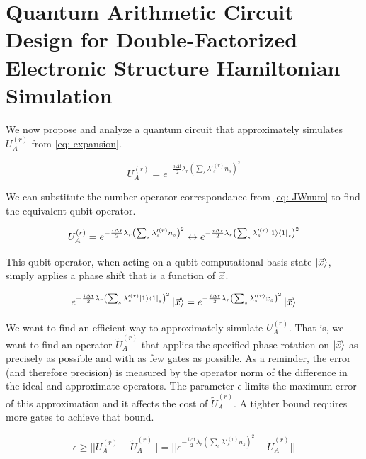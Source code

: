

\chapter{Quantum Arithmetic Circuit Design for Double-Factorized Electronic Structure Hamiltonian Simulation}

We now propose and analyze a quantum circuit that approximately simulates $U_A^{(r)}$ from \eqref{eq: expansion}.

\begin{equation}
    U_A^{(r)} = e^{-\frac{i\Delta t}{2}\lambda_r\left(\sum_s \lambda'^{(r)}_s n_s\right)^2} \label{eq: U_A}
\end{equation}

We can substitute the number operator correspondance from \eqref{eq: JWnum} to find the equivalent qubit operator.

\begin{equation}
    U_A^{(r)} = e^{-\frac{i\Delta t}{2}\lambda_r\left(\sum_s \lambda'^{(r)}_s n_s\right)^2} \leftrightarrow e^{-\frac{i\Delta t}{2}\lambda_r\left(\sum_s \lambda'^{(r)}_s \ket{1}\bra{1}_s\right)^2}
\end{equation}

This qubit operator, when acting on a qubit computational basis state $\ket{\vec{x}}$, simply applies a phase shift that is a function of $\vec{x}$.

\begin{equation}
    e^{-\frac{i\Delta t}{2}\lambda_r\left(\sum_s \lambda'^{(r)}_s \ket{1}\bra{1}_s\right)^2}\ket{\vec{x}} = e^{-\frac{i\Delta t}{2}\lambda_r\left(\sum_s \lambda'^{(r)}_s x_s\right)^2}\ket{\vec{x}}
\end{equation}

We want to find an efficient way to approximately simulate $U_A^{(r)}$. That is, we want to find an operator $\tilde{U}_A^{(r)}$ that applies the specified phase rotation on $\ket{\vec{x}}$ as precisely as possible and with as few gates as possible. As a reminder, the error (and therefore precision) is measured by the operator norm of the difference in the ideal and approximate operators. The parameter $\epsilon$ limits the maximum error of this approximation and it affects the cost of $\tilde{U}_A^{(r)}$. A tighter bound requires more gates to achieve that bound.

\begin{equation}
    \epsilon \geq ||U_A^{(r)} - \tilde{U}_A^{(r)}|| = ||e^{-\frac{i\Delta t}{2}\lambda_r\left(\sum_s \lambda'^{(r)}_s n_s\right)^2} - \tilde{U}_A^{(r)}|| \label{eq: error}
\end{equation}

